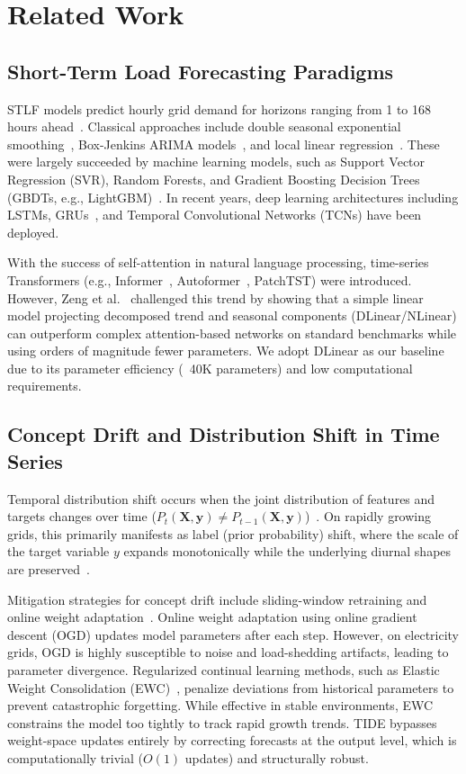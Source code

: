 \documentclass[10pt,twocolumn,letterpaper]{article}
\begin{document}
\section{Related Work}
\label{sec:related}

\subsection{Short-Term Load Forecasting Paradigms}
STLF models predict hourly grid demand for horizons ranging from 1 to 168 hours ahead~\cite{hippert2001neural}. Classical approaches include double seasonal exponential smoothing~\cite{taylor2003short}, Box-Jenkins ARIMA models~\cite{box2015time}, and local linear regression~\cite{mbamalu1993load}. These were largely succeeded by machine learning models, such as Support Vector Regression (SVR), Random Forests, and Gradient Boosting Decision Trees (GBDTs, e.g., LightGBM)~\cite{sobhani2020electricity}. In recent years, deep learning architectures including LSTMs, GRUs~\cite{khodayar2019rough}, and Temporal Convolutional Networks (TCNs) have been deployed. 

With the success of self-attention in natural language processing, time-series Transformers (e.g., Informer~\cite{zhou2021informer}, Autoformer~\cite{wu2021autoformer}, PatchTST) were introduced. However, Zeng et al.~\cite{zeng2023transformers} challenged this trend by showing that a simple linear model projecting decomposed trend and seasonal components (DLinear/NLinear) can outperform complex attention-based networks on standard benchmarks while using orders of magnitude fewer parameters. We adopt DLinear as our baseline due to its parameter efficiency (~40K parameters) and low computational requirements.

\subsection{Concept Drift and Distribution Shift in Time Series}
Temporal distribution shift occurs when the joint distribution of features and targets changes over time ($P_t(\mathbf{X}, \mathbf{y}) \neq P_{t-1}(\mathbf{X}, \mathbf{y})$)~\cite{gama2014survey, webb2016characterizing}. On rapidly growing grids, this primarily manifests as label (prior probability) shift, where the scale of the target variable $y$ expands monotonically while the underlying diurnal shapes are preserved~\cite{lu2018learning}.

Mitigation strategies for concept drift include sliding-window retraining and online weight adaptation~\cite{gama2014survey}. Online weight adaptation using online gradient descent (OGD) updates model parameters after each step. However, on electricity grids, OGD is highly susceptible to noise and load-shedding artifacts, leading to parameter divergence. Regularized continual learning methods, such as Elastic Weight Consolidation (EWC)~\cite{lu2018learning}, penalize deviations from historical parameters to prevent catastrophic forgetting. While effective in stable environments, EWC constrains the model too tightly to track rapid growth trends. TIDE bypasses weight-space updates entirely by correcting forecasts at the output level, which is computationally trivial ($O(1)$ updates) and structurally robust.
\end{document}
